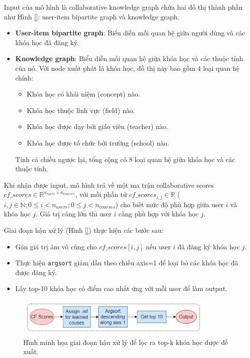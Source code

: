 Input của mô hình là collaborative knowledge graph chứa hai đồ thị thành phần như Hình \ref{}: user-item bipartite graph và knowledge graph. 
\begin{itemize}
    \item \textbf{User-item bipartite graph}: Biểu diễn mối quan hệ giữa người dùng và các khóa học đã đăng ký. 
    \item \textbf{Knowledge graph}: Biểu diễn mối quan hệ giữa khóa học và các thuộc tính của nó. Với node xuất phát là khóa học, đồ thị này bao gồm 4 loại quan hệ chính:
    \begin{itemize}
        \item Khóa học có khái niệm (concept) nào.
        \item Khóa học thuộc lĩnh vực (field) nào.
        \item Khóa học được dạy bởi giáo viên (teacher) nào.
        \item Khóa học được tổ chức bởi trường (school) nào.
    \end{itemize}
    Tính cả chiều ngược lại, tổng cộng có 8 loại quan hệ giữa khóa học và các thuộc tính.
\end{itemize}

Khi nhận được input, mô hình trả về một ma trận collaborative scores $cf\_scores \in \mathbb{R}^{n_{users} \times n_{courses}}$, với mỗi phần tử $cf\_scores_{i,j} \in \mathbb{R}$ ($i,j \in \mathbb{N}; 0 \leq i < n_{users}; 0 \leq j < n_{courses}$) cho biết mức độ phù hợp giữa user $i$ và khóa học $j$. Giá trị càng lớn thì user $i$ càng phù hợp với khóa học $j$.

Giai đoạn hậu xử lý (Hình \ref{}) thực hiện các bước sau:
\begin{itemize}
    \item Gán giá trị âm vô cùng cho $cf\_scores[i,j]$ nếu user $i$ đã đăng ký khóa học $j$.
    \item Thực hiện \texttt{argsort} giảm dần theo chiều axis=1 để loại bỏ các khóa học đã được đăng ký.
    \item Lấy top-10 khóa học có điểm cao nhất ứng với mỗi user để làm output.
\end{itemize}

\begin{figure}[ht]
    \centering
    \includegraphics[width=0.9\textwidth]{figures/70.png}
    \caption{Hình minh họa giai đoạn hậu xử lý để lọc ra top-k khóa học được đề xuất.}
    \label{fig:hinh4_2}
\end{figure}


